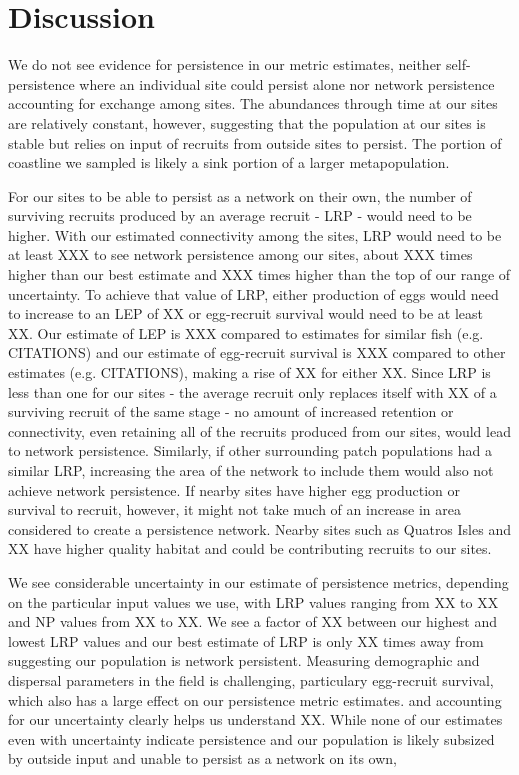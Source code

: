 \documentclass[12pt, oneside]{article}   	%
\begin{document}
\section*{Discussion}

We do not see evidence for persistence in our metric estimates, neither self-persistence where an individual site could persist alone nor network persistence accounting for exchange among sites. The abundances through time at our sites are relatively constant, however, suggesting that the population at our sites is stable but relies on input of recruits from outside sites to persist. The portion of coastline we sampled is likely a sink portion of a larger metapopulation. %

For our sites to be able to persist as a network on their own, the number of surviving recruits produced by an average recruit - LRP - would need to be higher. With our estimated connectivity among the sites, LRP would need to be at least XXX to see network persistence among our sites, about XXX times higher than our best estimate and XXX times higher than the top of our range of uncertainty. To achieve that value of LRP, either production of eggs would need to increase to an LEP of XX or egg-recruit survival would need to be at least XX. Our estimate of LEP is XXX compared to estimates for similar fish (e.g. CITATIONS) and our estimate of egg-recruit survival is XXX compared to other estimates (e.g. CITATIONS), making a rise of XX for either XX. Since LRP is less than one for our sites - the average recruit only replaces itself with XX of a surviving recruit of the same stage - no amount of increased retention or connectivity, even retaining all of the recruits produced from our sites, would lead to network persistence. Similarly, if other surrounding patch populations had a similar LRP, increasing the area of the network to include them would also not achieve network persistence. If nearby sites have higher egg production or survival to recruit, however, it might not take much of an increase in area considered to create a persistence network. Nearby sites such as Quatros Isles and XX have higher quality habitat and could be contributing recruits to our sites.

We see considerable uncertainty in our estimate of persistence metrics, depending on the particular input values we use, with LRP values ranging from XX to XX and NP values from XX to XX. We see a factor of XX between our highest and lowest LRP values and our best estimate of LRP is only XX times away from suggesting our population is network persistent. Measuring demographic and dispersal parameters in the field is challenging, particulary egg-recruit survival, which also has a large effect on our persistence metric estimates. 
and accounting for our uncertainty clearly helps us understand XX. While none of our estimates even with uncertainty indicate persistence and our population is likely subsized by outside input and unable to persist as a network on its own, 
\end{document}
